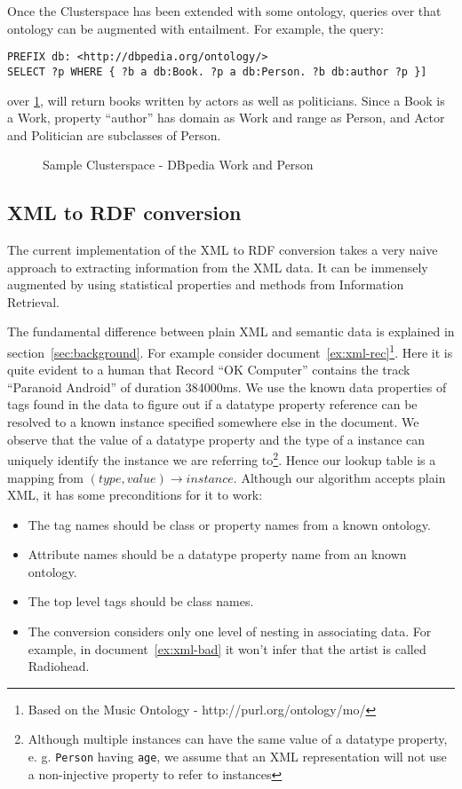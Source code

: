 \documentclass[conference]{IEEEtran}
\begin{document}
Once the Clusterspace has been extended with some ontology, queries over that
ontology can be augmented with entailment. For example, the query:

\begin{verbatim}
PREFIX db: <http://dbpedia.org/ontology/>
SELECT ?p WHERE { ?b a db:Book. ?p a db:Person. ?b db:author ?p }]
\end{verbatim}

over \ref{fig:person-cs-example}, will return books written by actors as well
as politicians. Since a Book is a Work, property ``author'' has domain as Work
and range as Person, and Actor and Politician are subclasses of Person.

\begin{figure}
    \caption{Sample Clusterspace - DBpedia Work and Person}
    \label{fig:person-cs-example}
\end{figure}

\subsection{XML to RDF conversion}

The current implementation of the XML to RDF conversion takes a very naive
approach to extracting information from the XML data. It can be immensely
augmented by using statistical properties and methods from Information
Retrieval.

The fundamental difference between plain XML and semantic data is explained in
section~\ref{sec:background}. For example consider
document~\ref{ex:xml-rec}\footnote{Based on the Music Ontology
- http://purl.org/ontology/mo/}. Here it is quite evident to a human that
Record ``OK Computer'' contains the track ``Paranoid Android'' of duration
384000ms. We use the known data properties of tags found in the data to figure
out if a datatype property reference can be resolved to a known instance
specified somewhere else in the document. We observe that the value of
a datatype property and the type of a instance can uniquely identify the
instance we are referring to\footnote{Although multiple instances can have the
    same value of a datatype property, e. g. \texttt{Person} having
    \texttt{age}, we assume that an XML representation will not use
a non-injective property to refer to instances}. Hence our lookup table is
a mapping from $(type, value)\rightarrow instance$. Although our algorithm
accepts plain XML, it has some preconditions for it to work:

\begin{itemize}
    \item The tag names should be class or property names from a known ontology.
    \item Attribute names should be a datatype property name from an known
        ontology.
    \item The top level tags should be class names.
    \item The conversion considers only one level of nesting in associating
        data. For example, in document~\ref{ex:xml-bad} it won't infer that the
        artist is called Radiohead.
\end{itemize}
\end{document}
